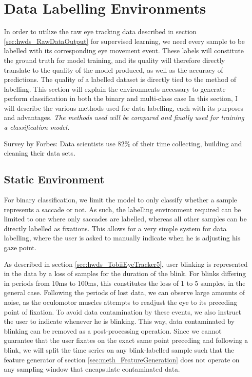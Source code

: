 \section{Data Labelling Environments} \label{sec:meth_DataLabellingEnvironments}

In order to utilize the raw eye tracking data described in section \ref{sec:hwds_RawDataOutput} for supervised learning, we need every sample to be labelled with its corresponding eye movement event. These labels will constitute the ground truth for model training, and its quality will therefore directly translate to the quality of the model produced, as well as the accuracy of predictions. The quality of a labelled dataset is directly tied to the method of labelling. This section will explain the environments necessary to generate perform classification in both the binary and multi-class case
In this section, I will describe the various methods used for data labelling, each with its purposes and advantages. \textit{The methods used will be compared and finally used for training a classification model.}

Survey by Forbes: Data scientists use 82\% of their time collecting, building and cleaning their data sets. 

\subsection{Static Environment}
For binary classification, we limit the model to only classify whether a sample represents a saccade or not. As such, the labelling environment required can be limited to one where only saccades are labelled, whereas  all other samples can be directly labelled as fixations. This allows for a very simple system for data labelling, where the user is asked to manually indicate when he is adjusting his gaze point.

As described in section \ref{sec:hwds_TobiiEyeTracker5}, user blinking is represented in the data by a loss of samples for the duration of the blink. For blinks differing in periods from 10ms to 100ms, this constitutes the loss of 1 to 5 samples, in the general case. Following the periods of lost data, we can observe large amounts of noise, as the oculomotor muscles attempts to readjust the eye to its preceding point of fixation. To avoid data contamination by these events, we also instruct the user to indicate whenever he is blinking. This way, data contaminated by blinking can be removed as a post-processing operation. Since we cannot guarantee that the user fixates on the exact same point preceding and following a blink, we will split the time series on any blink-labelled sample such that the feature generator of section \ref{sec:meth_FeatureGeneration} does not operate on any sampling window that encapsulate contaminated data. 

